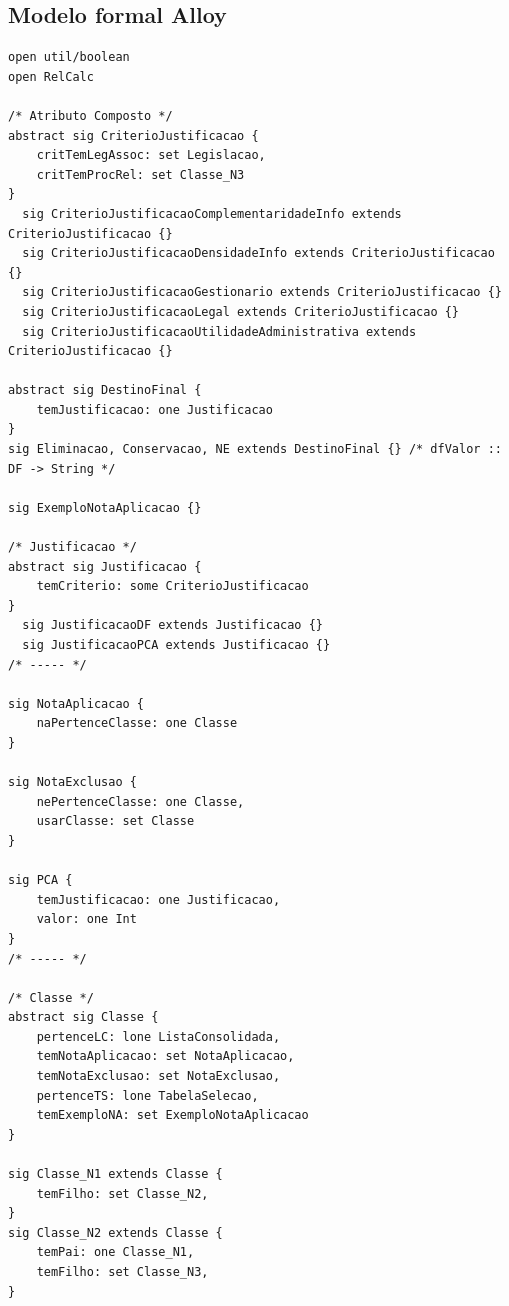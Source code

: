 \documentclass[tikz,runningheads,a4paper]{llncs}
\begin{document}
%
%
%
% 
% 
%

{}

\newpage

\begin{subappendices}
\renewcommand{\thesection}{\Alph{section}}%

\section{Modelo formal Alloy}

\begin{lstlisting}[language=alloy, frame=single]
open util/boolean
open RelCalc

/* Atributo Composto */
abstract sig CriterioJustificacao {
	critTemLegAssoc: set Legislacao,
	critTemProcRel: set Classe_N3
}
  sig CriterioJustificacaoComplementaridadeInfo extends CriterioJustificacao {}
  sig CriterioJustificacaoDensidadeInfo extends CriterioJustificacao {}
  sig CriterioJustificacaoGestionario extends CriterioJustificacao {}
  sig CriterioJustificacaoLegal extends CriterioJustificacao {}
  sig CriterioJustificacaoUtilidadeAdministrativa extends CriterioJustificacao {}

abstract sig DestinoFinal {
	temJustificacao: one Justificacao
}
sig Eliminacao, Conservacao, NE extends DestinoFinal {} /* dfValor :: DF -> String */

sig ExemploNotaAplicacao {}

/* Justificacao */
abstract sig Justificacao {
	temCriterio: some CriterioJustificacao
}
  sig JustificacaoDF extends Justificacao {}
  sig JustificacaoPCA extends Justificacao {}
/* ----- */

sig NotaAplicacao {
	naPertenceClasse: one Classe
}

sig NotaExclusao {
	nePertenceClasse: one Classe,
	usarClasse: set Classe
}

sig PCA {
	temJustificacao: one Justificacao,
	valor: one Int
}
/* ----- */

/* Classe */
abstract sig Classe {
	pertenceLC: lone ListaConsolidada,
	temNotaAplicacao: set NotaAplicacao,
	temNotaExclusao: set NotaExclusao,
	pertenceTS: lone TabelaSelecao,
	temExemploNA: set ExemploNotaAplicacao
}

sig Classe_N1 extends Classe {
	temFilho: set Classe_N2,
}
sig Classe_N2 extends Classe {
	temPai: one Classe_N1,
	temFilho: set Classe_N3,
}


\end{lstlisting}
\end{subappendices}
\end{document}
